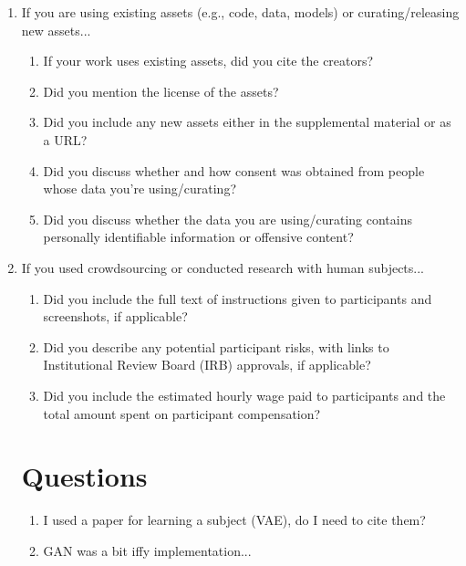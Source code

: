 \documentclass{article}
\begin{document}
\begin{enumerate}
\item If you are using existing assets (e.g., code, data, models) or curating/releasing new assets...
\begin{enumerate}
  \item If your work uses existing assets, did you cite the creators?
    \answerTODO{}
  \item Did you mention the license of the assets?
    \answerTODO{}
  \item Did you include any new assets either in the supplemental material or as a URL?
    \answerTODO{}
  \item Did you discuss whether and how consent was obtained from people whose data you're using/curating?
    \answerTODO{}
  \item Did you discuss whether the data you are using/curating contains personally identifiable information or offensive content?
    \answerTODO{}
\end{enumerate}


\item If you used crowdsourcing or conducted research with human subjects...
\begin{enumerate}
  \item Did you include the full text of instructions given to participants and screenshots, if applicable?
    \answerTODO{}
  \item Did you describe any potential participant risks, with links to Institutional Review Board (IRB) approvals, if applicable?
    \answerTODO{}
  \item Did you include the estimated hourly wage paid to participants and the total amount spent on participant compensation?
    \answerTODO{}
\end{enumerate}

\section{Questions}
\begin{enumerate}
    \item I used a paper for learning a subject (VAE), do I need to cite them?
    \item GAN was a bit iffy implementation...
\end{enumerate}

\end{enumerate}

\end{document}
